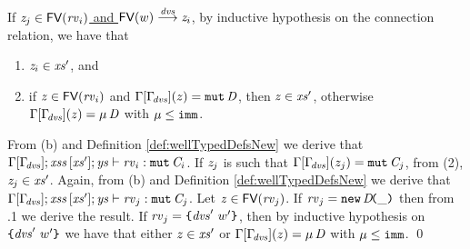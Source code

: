 If \underline{$\mathit{z}_j\in\textsf{FV}(\mathit{rv}_i)$ and $\textsf{FV}(w)\stackrel{\mathit{dvs}}{\longrightarrow}\mathit{z}_i$}, by inductive hypothesis
on the connection relation, we have that 
\begin{enumerate}[(1)]
\item $\mathit{z}_i\in\mathit{xs}'$, and
\item if $\mathit{z}\in\textsf{FV}(\mathit{rv}_i)$ and $\Gamma[\Gamma_{\!\mathit{dvs}}](z)=\texttt{mut}\,\mathit{D}$, then $\mathit{z}\in\mathit{xs}'$, otherwise 
 $\Gamma[\Gamma_{\!\mathit{dvs}}](z)=\mu\,\mathit{D}$ with $\mu\leq\texttt{imm}$.
\end{enumerate}
From (b) and Definition \ref{def:wellTypedDefsNew} we derive that
$\Gamma[\Gamma_{\!\mathit{dvs}}];\mathit{xss}\,[\mathit{xs}'];\mathit{ys}\vdash \mathit{rv}_i:\texttt{mut}\,\mathit{C}_i$.
If  $\mathit{z}_j$ is such that $\Gamma[\Gamma_{\!\mathit{dvs}}](z_j)=\texttt{mut}\,\mathit{C}_j$, from (2), $\mathit{z}_j\in\mathit{xs}'$.
Again, from (b) and Definition \ref{def:wellTypedDefsNew} we derive that
$\Gamma[\Gamma_{\!\mathit{dvs}}];\mathit{xss}\,[\mathit{xs}'];\mathit{ys}\vdash \mathit{rv}_j:\texttt{mut}\,\mathit{C}_j$.
Let $\mathit{z}\in\textsf{FV}(\mathit{rv}_j)$. If $\mathit{rv}_j=\texttt{new}\,\mathit{D}\!\texttt{(}\_\texttt{)}$
then from .1 we derive the result. 
If $\mathit{rv}_j=\texttt{\{}\mathit{dvs}'\ w'\texttt{\}}$, then by inductive
hypothesis on $\texttt{\{}\mathit{dvs}'\ w'\texttt{\}}$ we have that either $\mathit{z}\in\mathit{xs}'$ or $\Gamma[\Gamma_{\!\mathit{dvs}}](z)=\mu\,\mathit{D}$ with $\mu\leq\texttt{imm}$.
\qed


\label{sect:proof-sound}

